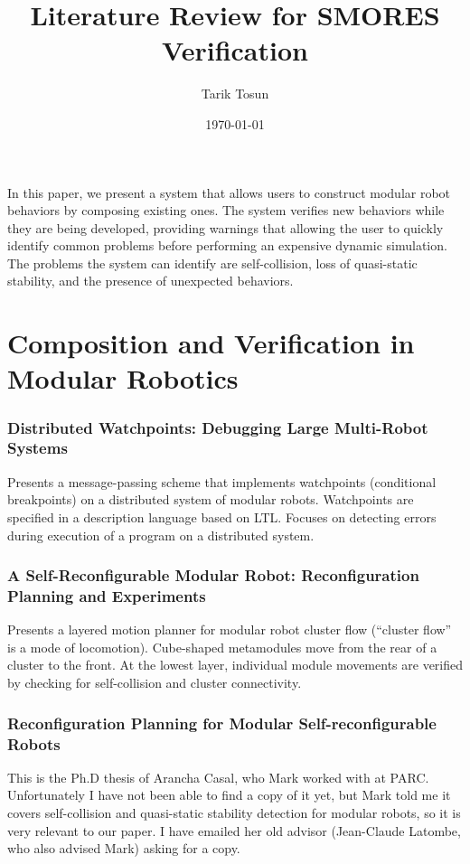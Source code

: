 \documentclass[12pt]{article}
\title{Literature Review for SMORES Verification}
\author{Tarik Tosun}
\date{\today}
\begin{document}
\maketitle

In this paper, we present a system that allows users to construct modular robot behaviors by composing existing
ones.  The system verifies new behaviors while they are being developed, providing
warnings that allowing the user to quickly identify common problems before performing an expensive dynamic simulation. The problems the system can identify are self-collision, loss of quasi-static stability, and the presence of unexpected behaviors.

\section*{Composition and Verification in Modular Robotics}
\subsubsection*{Distributed Watchpoints: Debugging Large Multi-Robot Systems \cite{de2008distributed} }
Presents a message-passing scheme that implements watchpoints (conditional breakpoints)
on a distributed system of modular robots. Watchpoints are specified in a description
language based on LTL. Focuses on detecting errors during execution of a program
on a distributed system.  
\subsubsection*{A Self-Reconfigurable Modular Robot: Reconfiguration Planning and Experiments \cite{yoshida2002self} }
Presents a layered motion planner for modular robot cluster flow (``cluster flow'' is a mode
of locomotion). Cube-shaped metamodules move from the rear of a cluster to the front. At the lowest layer, individual module movements are verified by checking for self-collision and cluster connectivity.

\subsubsection*{Reconfiguration Planning for Modular Self-reconfigurable Robots \cite{casal2002}}
This is the Ph.D thesis of Arancha Casal, who Mark worked with at PARC.  Unfortunately I have not
been able to find a copy of it yet, but Mark told me it covers self-collision and
quasi-static stability detection for modular robots, so it is very relevant to our
paper.  I have emailed her old advisor (Jean-Claude Latombe, who also advised Mark)
asking for a copy.
 
\end{document}
